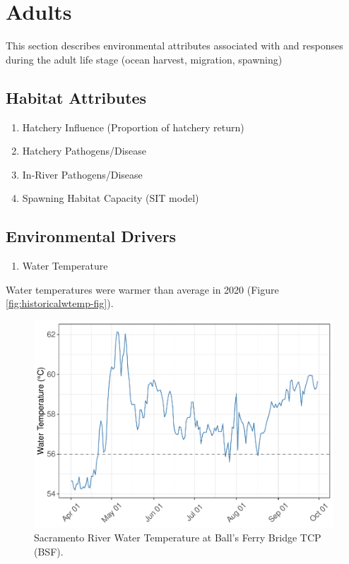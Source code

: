 \documentclass[
]{book}
\providecommand{\tightlist}{%
  \setlength{\itemsep}{0pt}\setlength{\parskip}{0pt}}
\theoremstyle{definition}
\theoremstyle{definition}
\theoremstyle{definition}
\theoremstyle{definition}
\theoremstyle{remark}
\begin{document}
\hypertarget{adults}{%
\chapter{Adults}\label{adults}}

This section describes environmental attributes associated with and responses during the adult life stage (ocean harvest, migration, spawning)

\hypertarget{habitat-attributes}{%
\section{Habitat Attributes}\label{habitat-attributes}}

\begin{enumerate}
\def\labelenumi{\arabic{enumi}.}
\item
  Hatchery Influence (Proportion of hatchery return)
\item
  Hatchery Pathogens/Disease
\item
  In-River Pathogens/Disease
\item
  Spawning Habitat Capacity (SIT model)
\end{enumerate}

\hypertarget{wq}{%
\section{Environmental Drivers}\label{wq}}

\begin{enumerate}
\def\labelenumi{\arabic{enumi}.}
\tightlist
\item
  Water Temperature
\end{enumerate}

Water temperatures were warmer than average in 2020 (Figure \ref{fig:historicalwtemp-fig}).

\begin{figure}
\centering
\includegraphics{_main_files/figure-latex/BSFwtemp-fig-1.pdf}
\caption{\label{fig:BSFwtemp-fig}Sacramento River Water Temperature at Ball's Ferry Bridge TCP (BSF).}
\end{figure}
\end{document}
